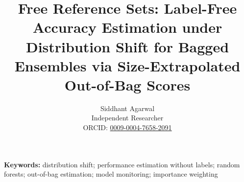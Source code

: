 \documentclass[11pt]{article}
\title{Free Reference Sets: Label-Free Accuracy Estimation under Distribution Shift for Bagged Ensembles via Size-Extrapolated Out-of-Bag Scores}
\author{Siddhant Agarwal\\ Independent Researcher\\ ORCID: \href{https://orcid.org/0009-0004-7658-2091}{0009-0004-7658-2091}}
\date{}
\begin{document}
\maketitle

\begin{abstract}

\end{abstract}

\noindent\textbf{Keywords:} distribution shift; performance estimation without labels; random forests; out-of-bag estimation; model monitoring; importance weighting









\end{document}
